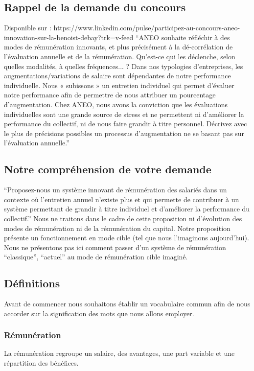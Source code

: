 \documentclass[12pt]{article}
\begin{document}
\subsection{Rappel de la demande du concours}
 Disponible sur : https://www.linkedin.com/pulse/participez-au-concours-aneo-innovation-sur-la-benoist-debay?trk=v-feed 
 “ANEO souhaite réfléchir à des modes de rémunération innovants, et plus précisément à la dé-corrélation de l’évaluation annuelle et de la rémunération.
 Qu’est-ce qui les déclenche, selon quelles modalités, à quelles fréquences... ?
 Dans nos typologies d’entreprises, les augmentations/variations de salaire sont dépendantes de notre performance individuelle. Nous « subissons » un entretien individuel qui permet d’évaluer notre performance afin de permettre de nous attribuer un pourcentage d’augmentation. 
 Chez ANEO, nous avons la conviction que les évaluations individuelles sont une grande source de stress et ne permettent ni d’améliorer la performance du collectif, ni de nous faire grandir à titre personnel.
 Décrivez avec le plus de précisions possibles un processus d’augmentation ne se basant pas sur l’évaluation annuelle.”

\subsection{Notre compréhension de votre demande}
 “Proposez-nous un système innovant de rémunération des salariés dans un contexte où l’entretien annuel n’existe plus et qui permette de contribuer à un système permettant de grandir à titre individuel et d’améliorer la performance du collectif.”
 Nous ne traitons dans le cadre de cette proposition ni d’évolution des modes de rémunération ni de la rémunération du capital. Notre proposition présente un fonctionnement en mode cible (tel que nous l’imaginons aujourd’hui). Nous ne présentons pas ici comment passer d’un système de rémunération “classique”, “actuel” au mode de rémunération cible imaginé.  

\subsection{Définitions}
 Avant de commencer nous souhaitons établir un vocabulaire commun afin de nous accorder sur la signification des mots que nous allons employer.

\subsubsection{Rémunération} 
 La rémunération regroupe un salaire, des avantages, une part variable et une répartition des bénéfices.
\end{document}
